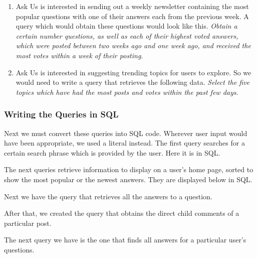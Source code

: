 \begin{enumerate}
	\item
	Ask Us is interested in sending out a weekly newsletter containing the most popular questions with one of their answers each from the previous week. A query which would obtain these questions would look like this. \emph{Obtain a certain number questions, as well as each of their highest voted answers, which were posted between two weeks ago and one week ago, and received the most votes within a week of their posting}.

	\item
	Ask Us is interested in suggesting trending topics for users to explore. So we would need to write a query that retrieves the following data. \emph{Select the five topics which have had the most posts and votes within the past few days}.

\end{enumerate}

\subsubsection{Writing the Queries in SQL}

Next we must convert these queries into SQL code. Wherever user input would have been appropriate, we used a literal instead. The first query searches for a certain search phrase which is provided by the user. Here it is in SQL.


The next queries retrieve information to display on a user's home page, sorted to show the most popular or the newest answers. They are displayed below in SQL.


Next we have the query that retrieves all the answers to a question.


After that, we created the query that obtains the direct child comments of a particular post.


The next query we have is the one that finds all answers for a particular user's questions.

